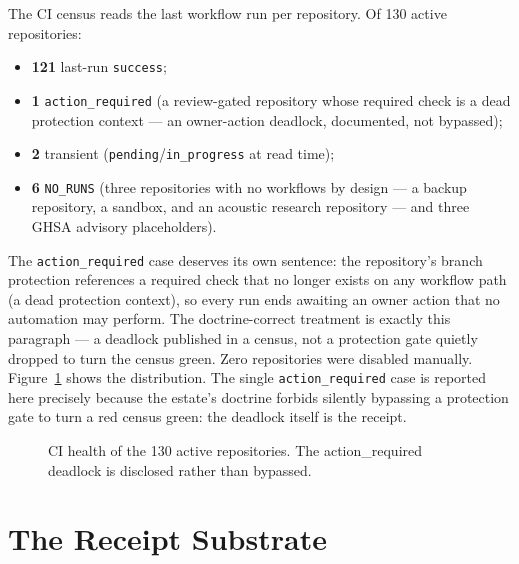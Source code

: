 ﻿\documentclass[11pt]{article}
\begin{document}
The CI census reads the last workflow run per repository. Of 130 active repositories:
\begin{itemize}
\item \textbf{121} last-run \texttt{success};
\item \textbf{1} \texttt{action\_required} (a review-gated repository whose required check is a dead protection context --- an owner-action deadlock, documented, not bypassed);
\item \textbf{2} transient (\texttt{pending}/\texttt{in\_progress} at read time);
\item \textbf{6} \texttt{NO\_RUNS} (three repositories with no workflows by design --- a backup repository, a sandbox, and an acoustic research repository --- and three GHSA advisory placeholders).
\end{itemize}
The \texttt{action\_required} case deserves its own sentence: the repository's branch protection references a required check that no longer exists on any workflow path (a dead protection context), so every run ends awaiting an owner action that no automation may perform. The doctrine-correct treatment is exactly this paragraph --- a deadlock published in a census, not a protection gate quietly dropped to turn the census green. Zero repositories were disabled manually. Figure~\ref{fig:ci} shows the distribution. The single \texttt{action\_required} case is reported here precisely because the estate's doctrine forbids silently bypassing a protection gate to turn a red census green: the deadlock itself is the receipt.

\begin{figure}[htbp]
\centering
{}
\caption{CI health of the 130 active repositories. The action\_required deadlock is disclosed rather than bypassed.}
\label{fig:ci}
\end{figure}

\section{The Receipt Substrate}
\label{sec:substrate}
\end{document}
